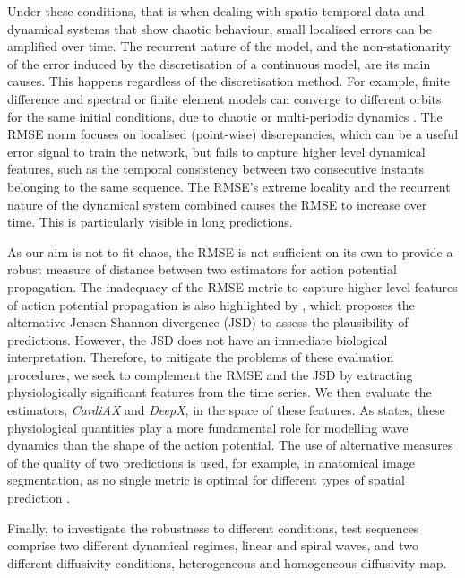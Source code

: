 \documentclass[utf8]{frontiersSCNS} %
\begin{document}
Under these conditions, that is when dealing with spatio-temporal data and dynamical systems that show chaotic behaviour, small localised errors can be amplified over time. The recurrent nature of the model, and the non-stationarity of the error induced by the discretisation of a continuous model, are its main causes.
This happens regardless of the discretisation method. For example, finite difference and spectral or finite element models can converge to different orbits for the same initial conditions, due to chaotic or multi-periodic dynamics \cite[]{skardal2014coexisting}.
The RMSE norm focuses on localised (point-wise) discrepancies, which can be a useful error signal to train the network, but fails to capture higher level dynamical features, such as the temporal consistency between two consecutive instants belonging to the same sequence.
The RMSE’s extreme locality and the recurrent nature of the dynamical system combined causes the RMSE to increase over time. This is particularly visible in long predictions.

As our aim is not to fit chaos, the RMSE is not sufficient on its own to provide a robust measure of distance between two estimators for action potential propagation.
The inadequacy of the RMSE metric to capture higher level features of action potential propagation is also highlighted by \cite{Herzog2018}, which proposes the alternative Jensen-Shannon divergence (JSD) to assess the plausibility of predictions. 
However, the JSD does not have an immediate biological interpretation.
Therefore, to mitigate the problems of these evaluation procedures, we seek to complement the RMSE and the JSD by extracting physiologically significant features from the time series. We then evaluate the estimators, \textit{CardiAX} and \textit{DeepX}, in the space of these features.
As \cite{Fenton2002} states, these physiological quantities play a more fundamental role for modelling wave dynamics than the shape of the action potential.
The use of alternative measures of the quality of two predictions is used, for example, in anatomical image segmentation, as no single metric is optimal for different types of spatial prediction \cite{taha2015metrics}.

Finally, to investigate the robustness to different conditions, test sequences comprise two different dynamical regimes, linear and spiral waves, and two different diffusivity conditions, heterogeneous and homogeneous diffusivity map.
\end{document}
